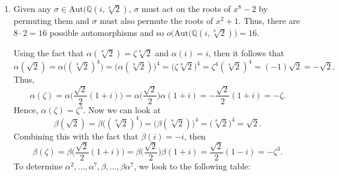 \documentclass[12pt]{article}
\makeatletter
\theoremstyle{definition}
\theoremstyle{remark}
\newenvironment{solution}[1][\bf{\textit{Solution}}]{\par
  
  \normalfont \topsep6\p@\@plus6\p@\relax
  \list{}{\leftmargin=0mm
          \rightmargin=4mm
          \settowidth{\itemindent}{\itshape#1}%
          \labelwidth=\itemindent
          \parsep=0pt \listparindent=\parindent 
  }
  \item[\hskip\labelsep
        \itshape
    #1\@addpunct{.}]\ignorespaces
}{%
  \popQED\endlist\@endpefalse
}
\makeatother
\begin{document}
\begin{enumerate}[leftmargin=*]
\begin{enumerate}[label=(\alph*)]
                    \begin{solution}
                        Given any $\sigma\in\text{Aut}(\mathbb{Q}(i,\sqrt[8]{2})$, $\sigma$ must act on the roots of $x^8-2$ by permuting them and $\sigma$ must also permute the roots of $x^2+1$. Thus, there are $8\cdot 2=16$ possible automorphisms and so $o\big(\text{Aut}(\mathbb{Q}(i,\sqrt[8]{2})\big)=16$.\par\hspace{4mm} Using the fact that $\alpha(\sqrt[8]{2})=\zeta\sqrt[8]{2}$ and $\alpha(i)=i$, then it follows that
                            \begin{equation*}
                                \alpha(\sqrt{2})=\alpha\big((\sqrt[8]{2})^4\big)=\big(\alpha(\sqrt[8]{2})\big)^4=\big(\zeta\sqrt[8]{2})^4=\zeta^4(\sqrt[4]{2})^4=(-1)\sqrt{2}=-\sqrt{2}.
                            \end{equation*}
                        Thus, 
                            \begin{equation*}
                                \alpha(\zeta)=\alpha\bigg(\frac{\sqrt{2}}{2}(1+i)\bigg)=\alpha\bigg(\frac{\sqrt{2}}{2}\bigg)\alpha(1+i)=-\frac{\sqrt{2}}{2}(1+i)=-\zeta.
                            \end{equation*}
                        Hence, $\alpha(\zeta)=\zeta^5$. Now we can look at 
                            \begin{equation*}
                                \beta(\sqrt{2})=\beta\big((\sqrt[8]{2})^4\big)=\big(\beta(\sqrt[8]{2})\big)^4=\big(\sqrt[8]{2})^4=\sqrt{2}.
                            \end{equation*}
                        Combining this with the fact that $\beta(i)=-i$, then
                            \begin{equation*}
                                \beta(\zeta)=\beta\bigg(\frac{\sqrt{2}}{2}(1+i)\bigg)=\beta\bigg(\frac{\sqrt{2}}{2}\bigg)\beta(1+i)=\frac{\sqrt{2}}{2}(1-i)=-\zeta^3.
                            \end{equation*}
                        To determine $\alpha^2,\dots,\alpha^7,\beta,\dots,\beta\alpha^7$, we look to the following table:
                            \begin{table}[htp]
\end{table}
\end{solution}
\end{enumerate}
\end{enumerate}
\end{document}
